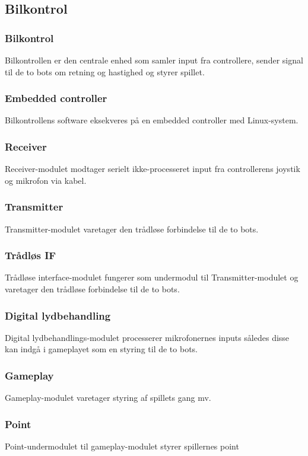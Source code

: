 \subsection{Bilkontrol}

\subsubsection*{\textbf{Bilkontrol}}
Bilkontrollen er den centrale enhed som samler input fra controllere, sender signal til de to bots om retning og hastighed og styrer spillet. 
\subsubsection*{\textbf{Embedded controller}}
Bilkontrollens software eksekveres på en embedded controller med Linux-system. 
\subsubsection*{\textbf{Receiver}}
Receiver-modulet modtager serielt ikke-processeret input fra controllerens joystik og mikrofon via kabel. 
\subsubsection*{\textbf{Transmitter}}
Transmitter-modulet varetager den trådløse forbindelse til de to bots.
\subsubsection*{\textbf{Trådløs IF}}
Trådløse interface-modulet fungerer som undermodul til Transmitter-modulet og varetager den trådløse forbindelse til de to bots. 
\subsubsection*{\textbf{Digital lydbehandling}}
Digital lydbehandlings-modulet processerer mikrofonernes inputs således disse kan indgå i gameplayet som en styring til de to bots.  
\subsubsection*{\textbf{Gameplay}}
Gameplay-modulet varetager styring af spillets gang mv.  
\subsubsection*{\textbf{Point}}
Point-undermodulet til gameplay-modulet styrer spillernes point 
